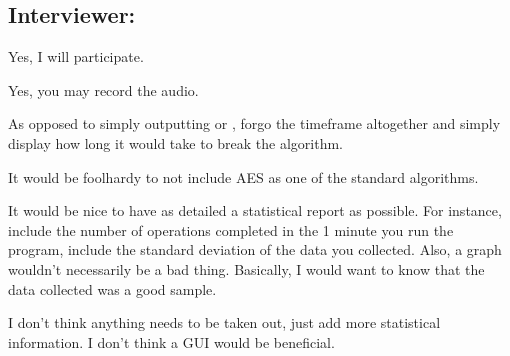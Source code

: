 \subsection{Interviewer: \md}


\begin{answer}{1}
Yes, I will participate.
\end{answer}


\begin{answer}{2}
Yes, you may record the audio.
\end{answer}


\begin{answer}{3}
As opposed to simply outputting  or , forgo the
timeframe altogether and simply display how long it would
take to break the algorithm.
\end{answer}


\begin{answer}{4}
It would be foolhardy to not include AES as one of the
standard algorithms.
\end{answer}


\begin{answer}{5}
It would be nice to have as detailed a statistical report
as possible. For instance, include the number of operations
completed in the 1 minute you run the program, include the
standard deviation of the data you collected. Also, a graph
wouldn't necessarily be a bad thing. Basically, I would want
to know that the data collected was a good sample.
\end{answer}


\begin{answer}{6}
I don't think anything needs to be taken out, just add more
statistical information. I don't think a GUI would be
beneficial.
\end{answer}

